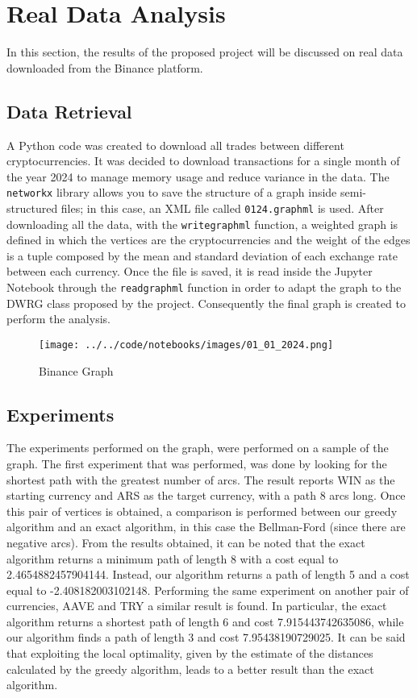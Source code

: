 \section{Real Data Analysis}\label{experiments}
In this section, the results of the proposed project will be discussed on real data downloaded from the Binance platform.
\subsection{Data Retrieval}
A Python code was created to download all trades between different cryptocurrencies. It was decided to download transactions for a single month of the year 2024 to manage memory usage and reduce variance in the data.
The \texttt{networkx} library allows you to save the structure of a graph inside semi-structured files; in this case, an XML file called \texttt{01\textunderscore 24.graphml} is used. 
After downloading all the data, with the \texttt{write\textunderscore graphml} function, a weighted graph is defined in which the vertices are the cryptocurrencies and the weight of the edges is a tuple composed by the mean and standard deviation of each exchange rate between each currency.
Once the file is saved, it is read inside the Jupyter Notebook through the \texttt{read\textunderscore graphml} function in order to adapt the graph to the DWRG class proposed by the project. Consequently the final graph is created to perform the analysis.

\begin{figure}[h!]
	\centering
	\texttt{[image: ../../code/notebooks/images/01\_01\_2024.png]} %
	\caption{Binance Graph}
	\label{plot}
\end{figure}

\subsection{Experiments}
The experiments performed on the graph, were performed on a sample of the graph.
The first experiment that was performed, was done by looking for the shortest path with the greatest number of arcs. The result reports WIN as the starting currency and ARS as the target currency, with a path 8 arcs long. Once this pair of vertices is obtained, a comparison is performed between our greedy algorithm and an exact algorithm, in this case the Bellman-Ford (since there are negative arcs).
From the results obtained, it can be noted that the exact algorithm returns a minimum path of length 8 with a cost equal to 2.4654882457904144. Instead, our algorithm returns a path of length 5 and a cost equal to -2.408182003102148. 
Performing the same experiment on another pair of currencies, AAVE and TRY a similar result is found.
In particular, the exact algorithm returns a shortest path of length 6 and cost 7.915443742635086, while our algorithm finds a path of length 3 and cost 7.95438190729025.
It can be said that exploiting the local optimality, given by the estimate of the distances calculated by the greedy algorithm, leads to a better result than the exact algorithm.

